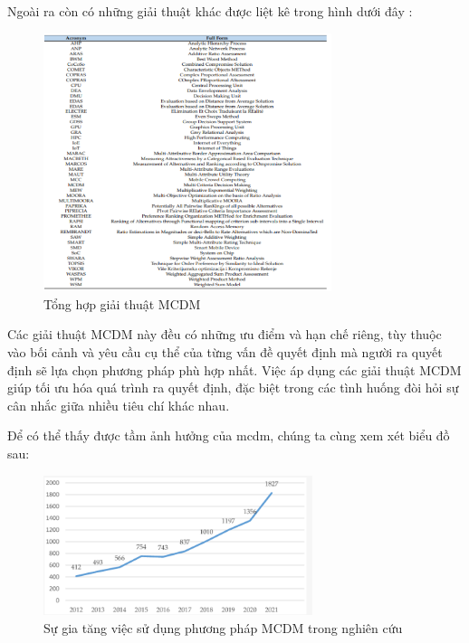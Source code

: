 Ngoài ra còn có những giải thuật khác được liệt kê trong hình dưới đây : 

\begin{figure}[H]
    \centering
    \includegraphics[width=0.75\textwidth]{images/chap2/MCDMalgorithm.png}
    \vspace{0.5cm}
    \caption{Tổng hợp giải thuật MCDM \cite{pijush}}
\end{figure}

Các giải thuật MCDM này đều có những ưu điểm và hạn chế riêng, tùy thuộc vào bối cảnh và yêu cầu cụ thể của từng vấn đề quyết định mà người ra quyết định sẽ lựa chọn phương pháp phù hợp nhất. Việc áp dụng các giải thuật MCDM giúp tối ưu hóa quá trình ra quyết định, đặc biệt trong các tình huống đòi hỏi sự cân nhắc giữa nhiều tiêu chí khác nhau. 

Để có thể thấy được tầm ảnh hưởng của \acrshort{mcdm}, chúng ta cùng xem xét biểu đồ sau: 
\begin{figure}[H]
    \centering
    \includegraphics[width=0.7\textwidth]{images/chap2/MCDMgraph.png}
    \vspace{0.5cm}
    \caption{Sự gia tăng việc sử dụng phương pháp MCDM trong nghiên cứu}
\end{figure}

